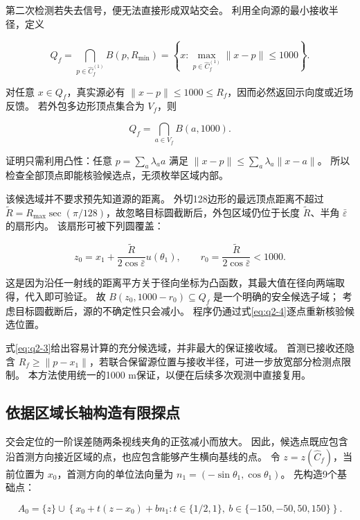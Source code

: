 第二次检测若失去信号，便无法直接形成双站交会。
利用全向源的最小接收半径，定义

\begin{equation}\label{eq:q2-3}
Q_f=\bigcap_{p\in\widehat C_f^{(1)}}B(p,R_{\min})
=\left\{x:\max_{p\in\widehat C_f^{(1)}}\|x-p\|\le1000\right\}.
\end{equation}

对任意 \(x\in Q_f\)，真实源必有 \(\|x-p\|\le1000\le R_f\)，因而必然返回示向度或近场反馈。
若外包多边形顶点集合为 \(V_f\)，则

\begin{equation}\label{eq:q2-4}
Q_f=\bigcap_{a\in V_f}B(a,1000).
\end{equation}

证明只需利用凸性：任意 \(p=\sum_a\lambda_a a\) 满足 \(\|x-p\|\le\sum_a\lambda_a\|x-a\|\)。
所以检查全部顶点即能核验候选点，无须枚举区域内部。

该候选域并不要求预先知道源的距离。
外切128边形的最远顶点距离不超过 \(\widetilde R=R_{\max}\sec(\pi/128)\)，故忽略目标圆截断后，外包区域仍位于长度 \(\widetilde R\)、半角 \(\bar\varepsilon\) 的扇形内。
该扇形可被下列圆覆盖：

\begin{equation}\label{eq:q2-5}
z_0=x_1+\frac{\widetilde R}{2\cos\bar\varepsilon}u(\theta_1),
\qquad r_0=\frac{\widetilde R}{2\cos\bar\varepsilon}<1000.
\end{equation}

这是因为沿任一射线的距离平方关于径向坐标为凸函数，其最大值在径向两端取得，代入即可验证。
故 \(B(z_0,1000-r_0)\subseteq Q_f\) 是一个明确的安全候选子域；
考虑目标圆截断后，源的不确定性只会减小。
程序仍通过式\eqref{eq:q2-4}逐点重新核验候选位置。

式\eqref{eq:q2-3}给出容易计算的充分候选域，并非最大的保证接收域。
首测已接收还隐含 \(R_f\ge\|p-x_1\|\)，若联合保留源位置与接收半径，可进一步放宽部分检测点限制。
本方法使用统一的1000 m保证，以便在后续多次观测中直接复用。

\subsection{依据区域长轴构造有限探点}\label{sec:q2-3}

交会定位的一阶误差随两条视线夹角的正弦减小而放大。
因此，候选点既应包含沿首测方向接近区域的点，也应包含能够产生横向基线的点。
令 \(z=z(\widehat C_f)\)，当前位置为 \(x_0\)，首测方向的单位法向量为 \(n_1=(-\sin\theta_1,\cos\theta_1)\)。
先构造9个基础点：

\begin{equation}\label{eq:q2-6}
A_0=\{z\}\cup\left\{
x_0+t(z-x_0)+b n_1:
t\in\{1/2,1\},\ b\in\{-150,-50,50,150\}
\right\}.
\end{equation}

